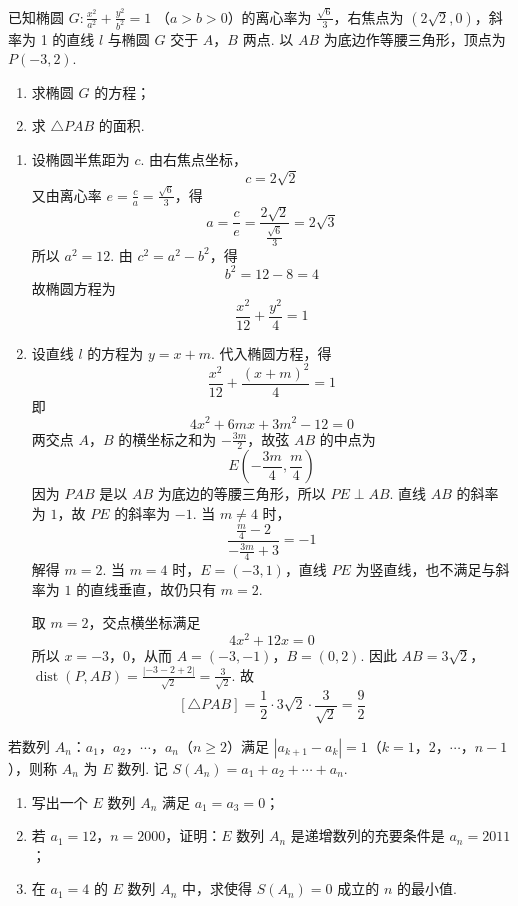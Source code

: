 \begin{problem}
已知椭圆 \(G: \frac{x^2}{a^{2}} + \frac{y^2}{b^{2}} = 1 \) （\(a > b > 0\)）的离心率为 \(\frac{\sqrt{6}}{3}\)，右焦点为 \((2\sqrt{2}, 0)\)，斜率为 1 的直线 \(l\) 与椭圆 \(G\) 交于 \(A\)，\(B\) 两点. 以 \(AB\) 为底边作等腰三角形，顶点为 \(P(-3, 2)\).
\begin{enumerate}
\item 求椭圆 \(G\) 的方程；
\item 求 \( \triangle PAB \) 的面积.
\end{enumerate}
\end{problem}

\begin{solution}
\begin{enumerate}
\item 设椭圆半焦距为 \(c\). 由右焦点坐标，
\[
c=2\sqrt{2}
\]
又由离心率 \(e=\frac{c}{a}=\frac{\sqrt{6}}{3}\)，得
\[
a=\frac{c}{e}
=\frac{2\sqrt{2}}{\frac{\sqrt{6}}{3}}=2\sqrt{3}
\]
所以 \(a^{2}=12\). 由 \(c^{2}=a^{2}-b^{2}\)，得
\[
b^{2}=12-8=4
\]
故椭圆方程为
\[
\frac{x^{2}}{12}+\frac{y^{2}}{4}=1
\]
\item 设直线 \(l\) 的方程为 \(y=x+m\). 代入椭圆方程，得
\[
\frac{x^{2}}{12}+\frac{(x+m)^{2}}{4}=1
\]
即
\[
4x^{2}+6mx+3m^{2}-12=0
\]
两交点 \(A\)，\(B\) 的横坐标之和为 \(-\frac{3m}{2}\)，故弦 \(AB\)
的中点为
\[
E\left(-\frac{3m}{4},\frac{m}{4}\right)
\]
因为 \(PAB\) 是以 \(AB\) 为底边的等腰三角形，所以 \(PE\perp AB\).
直线 \(AB\) 的斜率为 \(1\)，故 \(PE\) 的斜率为 \(-1\). 当
\(m\ne4\) 时，
\[
\frac{\frac{m}{4}-2}{-\frac{3m}{4}+3}=-1
\]
解得 \(m=2\). 当 \(m=4\) 时，\(E=(-3,1)\)，直线 \(PE\)
为竖直线，也不满足与斜率为 \(1\) 的直线垂直，故仍只有 \(m=2\).

取 \(m=2\)，交点横坐标满足
\[
4x^{2}+12x=0
\] 所以 \(x=-3\)，\(0\)，从而
\(A=(-3,-1)\)，\(B=(0,2)\).
因此
\(AB=3\sqrt{2}\)，\(\operatorname{dist}(P,AB) =\frac{|-3-2+2|}{\sqrt{2}} =\frac{3}{\sqrt{2}}\).
故
\[
[\triangle PAB]
=\frac{1}{2}\cdot3\sqrt{2}\cdot\frac{3}{\sqrt{2}}
=\frac{9}{2}
\]
\end{enumerate}
\end{solution}

\begin{problem}
若数列 \(A_{n}\)：\(a_{1}\)，\(a_{2}\)，\(\cdots\)，\(a_{n}\)（\(n \geqslant 2\)）满足 \(\left|a_{k+1} - a_{k}\right| = 1\)（\(k = 1\)，\(2\)，\(\cdots\)，\(n-1\)），则称 \(A_{n}\) 为 \(E\) 数列. 记 \(S(A_{n}) = a_{1} + a_{2} + \cdots + a_{n}\).
\begin{enumerate}
\item 写出一个 \(E\) 数列 \(A_{n}\) 满足 \(a_{1}=a_{3}=0\)；
\item 若 \(a_1 = 12\)，\(n = 2000\)，证明：\(E\) 数列 \(A_n\) 是递增数列的充要条件是 \(a_n = 2011\)；
\item 在 \(a_1 = 4\) 的 \(E\) 数列 \(A_n\) 中，求使得 \(S(A_n) = 0\) 成立的 \(n\) 的最小值.
\end{enumerate}
\end{problem}

